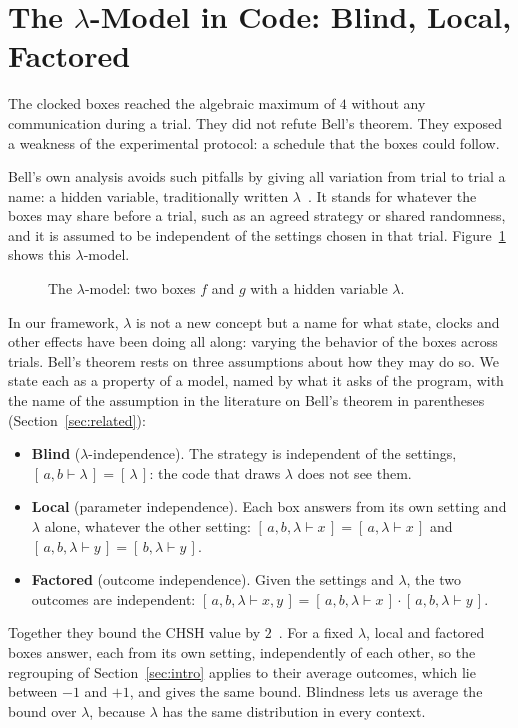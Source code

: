 \documentclass[11pt]{article}
\newcommand{\pr}[2]{[\,#1 \vdash #2\,]}
\newcommand{\fr}[1]{[\,#1\,]}
\newcommand{\twoboxes}{%
  \node[fbox] (f) at (0,0) {$f$};
  \node[gbox] (g) at (5.4,0) {$g$};
  \node (a) at (0,1.3) {$a \in \{0,1\}$};
  \node (b) at (5.4,1.3) {$b \in \{0,1\}$};
  \node (x) at (0,-1.3) {$x \in \{\pm1\}$};
  \node (y) at (5.4,-1.3) {$y \in \{\pm1\}$};
  \draw[->] (a) -- (f); \draw[->] (b) -- (g);
  \draw[->] (f) -- (x); \draw[->] (g) -- (y);
  \node[font=\bfseries, anchor=east] at (-1.25,0) {Alice};
  \node[font=\bfseries, anchor=west] at (6.65,0) {Bob};}
\begin{document}
\section{The \texorpdfstring{$\lambda$}{lambda}-Model in Code: Blind, Local, Factored}\label{sec:lambda}

The clocked boxes reached the algebraic maximum of $4$ without any communication during a trial. They did not refute Bell's theorem. They exposed a weakness of the experimental protocol: a schedule that the boxes could follow.

Bell's own analysis avoids such pitfalls by giving all variation from trial to trial a name: a hidden variable, traditionally written $\lambda$~\citep{Bell1964}. It stands for whatever the boxes may share before a trial, such as an agreed strategy or shared randomness, and it is assumed to be independent of the settings chosen in that trial. Figure~\ref{fig:lambda} shows this $\lambda$-model.

\begin{figure}[htbp]
\centering
{}
\caption{The $\lambda$-model: two boxes $f$ and $g$ with a hidden variable $\lambda$.}
\label{fig:lambda}
\end{figure}

In our framework, $\lambda$ is not a new concept but a name for what state, clocks and other effects have been doing all along: varying the behavior of the boxes across trials. Bell's theorem rests on three assumptions about how they may do so. We state each as a property of a model, named by what it asks of the program, with the name of the assumption in the literature on Bell's theorem in parentheses (Section~\ref{sec:related}):
\begin{itemize}
\item \textbf{Blind} ($\lambda$-independence). The strategy is independent of the settings, $\pr{a, b}{\lambda} = \fr{\lambda}$: the code that draws $\lambda$ does not see them.
\item \textbf{Local} (parameter independence). Each box answers from its own setting and $\lambda$ alone, whatever the other setting: $\pr{a, b, \lambda}{x} = \pr{a, \lambda}{x}$ and $\pr{a, b, \lambda}{y} = \pr{b, \lambda}{y}$.
\item \textbf{Factored} (outcome independence). Given the settings and $\lambda$, the two outcomes are independent: $\pr{a, b, \lambda}{x, y} = \pr{a, b, \lambda}{x} \cdot \pr{a, b, \lambda}{y}$.
\end{itemize}
Together they bound the CHSH value by $2$~\citep{Bell1964,Brandenburger2008}. For a fixed $\lambda$, local and factored boxes answer, each from its own setting, independently of each other, so the regrouping of Section~\ref{sec:intro} applies to their average outcomes, which lie between $-1$ and $+1$, and gives the same bound. Blindness lets us average the bound over $\lambda$, because $\lambda$ has the same distribution in every context.
\end{document}
